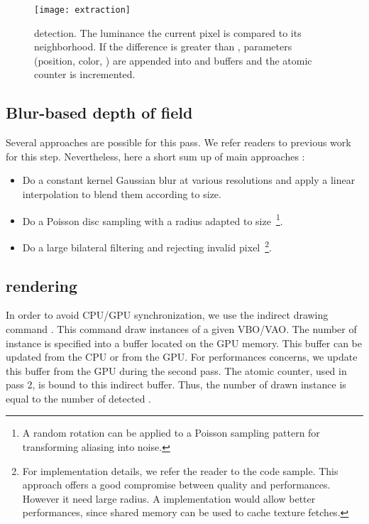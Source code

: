 	\begin{figure}[htb]\centering
	\texttt{[image: extraction]}
	\caption{\Bokeh detection. The luminance the current pixel is compared to its neighborhood. If the difference is greater than , \bokeh parameters (position, color, \coc) are appended into  and  buffers and the atomic counter  is incremented.}
	\label{DeRousiers:detection}
	\end{figure}

\subsection{Blur-based depth of field}
Several approaches are possible for this pass. We refer readers to previous work for this step. Nevertheless, here a short sum up of main approaches :
\begin{itemize}
	\item Do a constant kernel Gaussian blur at various resolutions and apply a linear interpolation to blend them according to \coc size.
	\item Do a Poisson disc sampling with a radius adapted to \coc size~\footnote{A random rotation can be applied to a Poisson sampling pattern for transforming aliasing into noise.}.
	\item Do a large bilateral filtering and rejecting invalid pixel~\footnote{For implementation details, we refer the reader to the code sample. This approach offers a good compromise between quality and performances. However it need large radius. A \opencl implementation would allow better performances, since shared memory can be used to cache texture fetches.}.
\end{itemize}


\subsection{\Bokeh rendering}
In order to avoid CPU/GPU synchronization, we use the indirect drawing command . This command draw instances of a given VBO/VAO. The number of instance is specified into a buffer located on the GPU memory. This buffer can be updated from the CPU or from the GPU. For performances concerns, we update this buffer from the GPU during the second pass. The atomic counter, used in pass 2, is bound to this indirect buffer. Thus, the number of drawn instance is equal to the number of detected \bokeh.

